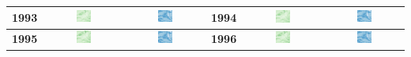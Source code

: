 \begin{longtable}{|c|c|c|c|c|c|}
    \textbf{1993} & \includegraphics[width=0.2\textwidth]{img_sat/NDVI_1993.png} & \includegraphics[width=0.2\textwidth]{img_sat/NSI_1993.png} &
    \textbf{1994} & \includegraphics[width=0.2\textwidth]{img_sat/NDVI_1994.png} & \includegraphics[width=0.2\textwidth]{img_sat/NSI_1994.png} \\
    \hline
    

    \textbf{1995} & \includegraphics[width=0.2\textwidth]{img_sat/NDVI_1995.png} & \includegraphics[width=0.2\textwidth]{img_sat/NSI_1995.png} &
    \textbf{1996} & \includegraphics[width=0.2\textwidth]{img_sat/NDVI_1996.png} & \includegraphics[width=0.2\textwidth]{img_sat/NSI_1996.png} \\
    \hline
    


\end{longtable}
